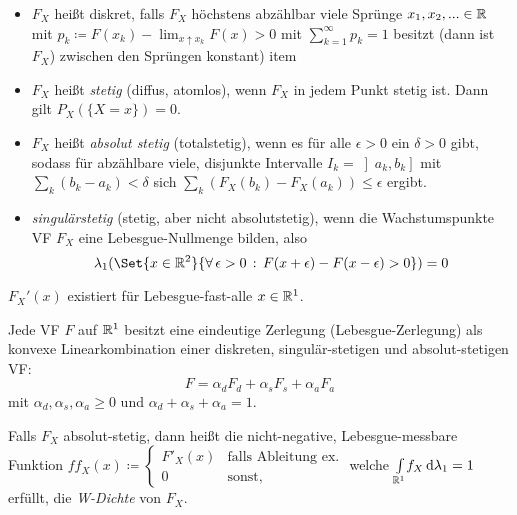 \documentclass{cheat-sheet}
\begin{document}
\begin{defn}
  \begin{itemize}
    \item $F_X$ heißt diskret, falls $F_X$ höchstens abzählbar viele Sprünge $x_1, x_2, ... \in \mathbb{R}$ mit $p_k \coloneqq F(x_k) - \lim_{x \uparrow x_k} F(x) > 0$ mit $\sum_{k=1}^\infty p_k = 1$ besitzt (dann ist $F_X$) zwischen den Sprüngen konstant)
    item 
    \item $F_X$ heißt \emph{stetig} (diffus, atomlos), wenn $F_X$ in jedem Punkt stetig ist. Dann gilt $P_X(\{ X = x \}) = 0$.
    \item $F_X$ heißt \emph{absolut stetig} (totalstetig), wenn es für alle $\epsilon > 0$ ein $\delta > 0$ gibt, sodass für abzählbare viele, disjunkte Intervalle $I_k = \left]a_k, b_k\right]$ mit $\sum_{k} (b_k - a_k) < \delta$ sich $\sum_{k} (F_X(b_k) - F_X(a_k)) \leq \epsilon$ ergibt.
    \item \emph{singulärstetig} (stetig, aber nicht absolutstetig), wenn die Wachstumspunkte VF $F_X$ eine Lebesgue-Nullmenge bilden, also
    \[ \lambda_1(\Set{ x \in \R^2 }{ \fa{\epsilon > 0} F(x+\epsilon)- F(x-\epsilon) > 0 }) = 0 \]
  \end{itemize}
\end{defn}

\begin{satz}
  $F_X'(x)$ existiert für Lebesgue-fast-alle $x \in \mathbb{R}^1$.
\end{satz}

\begin{satz}
  Jede VF $F$ auf $\mathbb{R}^1$ besitzt eine eindeutige Zerlegung (Lebesgue-Zerlegung) als konvexe Linearkombination einer diskreten, singulär-stetigen und absolut-stetigen VF:
  \[ F = \alpha_d F_d + \alpha_s F_s + \alpha_a F_a \]
  mit $\alpha_d, \alpha_s, \alpha_a \geq 0$ und $\alpha_d + \alpha_s + \alpha_a = 1$.
\end{satz}

\begin{defn}
  Falls $F_X$ absolut-stetig, dann heißt die nicht-negative, Lebesgue-messbare Funktion $ff_X(x) \coloneqq \begin{cases} F'_X(x) & \text{falls Ableitung ex.} \\ 0 & \text{sonst,} \end{cases}$
  welche ${\textstyle \int\limits_{\mathbb{R}^1}^{}} f_X \,\mathrm{d} \lambda_1 = 1$ erfüllt, die \emph{W-Dichte} von $F_X$.
\end{defn}
\end{document}

